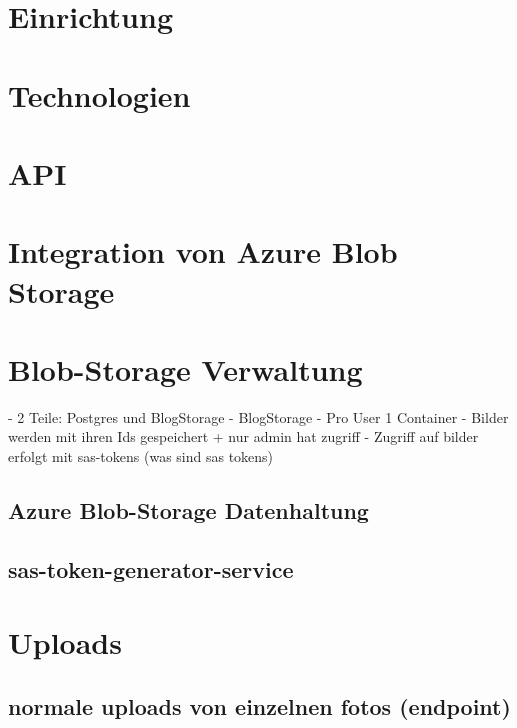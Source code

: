 
\section{Einrichtung}


\section{Technologien}


\section{API}


\section{Integration von Azure Blob Storage}

\section{Blob-Storage Verwaltung}



\cite{MicrosoftCorporationv}
- 2 Teile: Postgres und BlogStorage
- BlogStorage
    - Pro User 1 Container
    - Bilder werden mit ihren Ids gespeichert + nur admin hat zugriff
    - Zugriff auf bilder erfolgt mit sas-tokens (was sind sas tokens)

\subsection{Azure Blob-Storage Datenhaltung}
\label{subsection:azure_blob_storage_datamodel}

\subsection{sas-token-generator-service}

\section{Uploads}


\subsection{normale uploads von einzelnen fotos (endpoint)}


